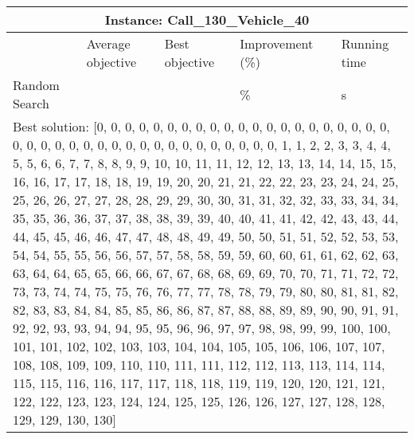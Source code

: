 \documentclass[]{article}
\begin{document}
\begin{table}[!ht]
	\hskip-1.3cm\begin{tabular}{|m{2.8cm}|>{\centering\arraybackslash}m{2.8cm}|>{\centering\arraybackslash}m{2.8cm}|>{\centering\arraybackslash}m{2.8cm}|>{\centering\arraybackslash}m{2.8cm}|}
		\hline
		\multicolumn{5}{|c|}{Instance: Call\_130\_Vehicle\_40}\\
		\hline
		& Average objective & Best objective & Improvement (\%) & Running time\\
		\hline
		Random Search & 76627567.00 & 76627567.00 & 0.000000 \% & 3.671 s\\
		\hline
		\multicolumn{5}{|m{14cm}|}{Best solution: [0, 0, 0, 0, 0, 0, 0, 0, 0, 0, 0, 0, 0, 0, 0, 0, 0, 0, 0, 0, 0, 0, 0, 0, 0, 0, 0, 0, 0, 0, 0, 0, 0, 0, 0, 0, 0, 0, 0, 0, 1, 1, 2, 2, 3, 3, 4, 4, 5, 5, 6, 6, 7, 7, 8, 8, 9, 9, 10, 10, 11, 11, 12, 12, 13, 13, 14, 14, 15, 15, 16, 16, 17, 17, 18, 18, 19, 19, 20, 20, 21, 21, 22, 22, 23, 23, 24, 24, 25, 25, 26, 26, 27, 27, 28, 28, 29, 29, 30, 30, 31, 31, 32, 32, 33, 33, 34, 34, 35, 35, 36, 36, 37, 37, 38, 38, 39, 39, 40, 40, 41, 41, 42, 42, 43, 43, 44, 44, 45, 45, 46, 46, 47, 47, 48, 48, 49, 49, 50, 50, 51, 51, 52, 52, 53, 53, 54, 54, 55, 55, 56, 56, 57, 57, 58, 58, 59, 59, 60, 60, 61, 61, 62, 62, 63, 63, 64, 64, 65, 65, 66, 66, 67, 67, 68, 68, 69, 69, 70, 70, 71, 71, 72, 72, 73, 73, 74, 74, 75, 75, 76, 76, 77, 77, 78, 78, 79, 79, 80, 80, 81, 81, 82, 82, 83, 83, 84, 84, 85, 85, 86, 86, 87, 87, 88, 88, 89, 89, 90, 90, 91, 91, 92, 92, 93, 93, 94, 94, 95, 95, 96, 96, 97, 97, 98, 98, 99, 99, 100, 100, 101, 101, 102, 102, 103, 103, 104, 104, 105, 105, 106, 106, 107, 107, 108, 108, 109, 109, 110, 110, 111, 111, 112, 112, 113, 113, 114, 114, 115, 115, 116, 116, 117, 117, 118, 118, 119, 119, 120, 120, 121, 121, 122, 122, 123, 123, 124, 124, 125, 125, 126, 126, 127, 127, 128, 128, 129, 129, 130, 130]}\\
		\hline
	\end{tabular}
\end{table}
\end{document}
